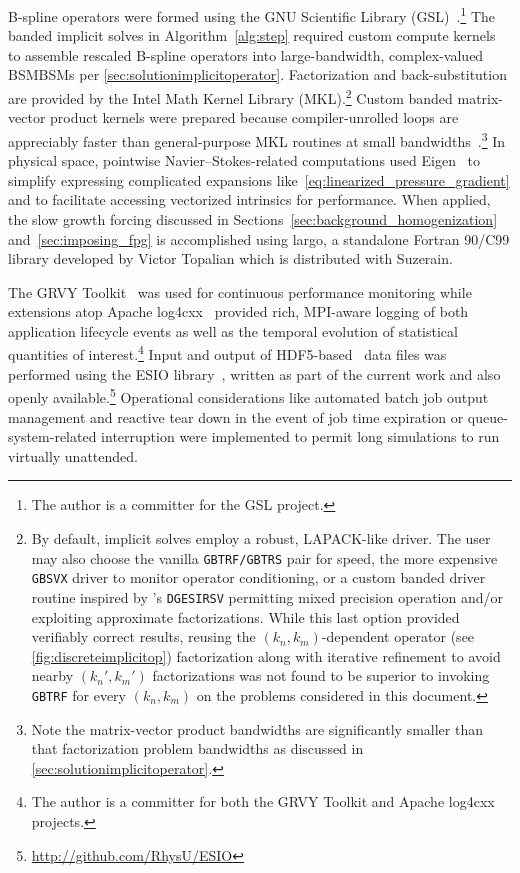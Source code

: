 B-spline operators were formed using the GNU Scientific Library
(GSL)~\citep{Eaton2008GNU}.\footnote{%
    The author is a committer for the GSL project.
}
The banded implicit solves in Algorithm~\ref{alg:step} required custom compute
kernels to assemble rescaled B-spline operators into large-bandwidth,
complex-valued BSMBSMs per \autoref{sec:solutionimplicitoperator}.
Factorization and back-substitution are provided by
the Intel\textsuperscript{\textregistered} Math Kernel Library (MKL).\footnote{%
    By default, implicit solves employ a robust, LAPACK-like driver.  The user
    may also choose the vanilla \texttt{GBTRF/GBTRS} pair for speed, the more
    expensive \texttt{GBSVX} driver to monitor operator conditioning, or a
    custom banded driver routine inspired by \citet{Langou2006Exploiting}'s
    \texttt{DGESIRSV} permitting mixed precision operation and/or exploiting
    approximate factorizations.  While this last option provided verifiably
    correct results, reusing the $(k_n,k_m)$-dependent operator (see
    \autoref{fig:discreteimplicitop}) factorization along with iterative
    refinement to avoid nearby $(k_n',k_m')$ factorizations was not found to be
    superior to invoking \texttt{GBTRF} for every $(k_n,k_m)$ on the problems
    considered in this document.
}
Custom banded matrix-vector product kernels were prepared because
compiler-unrolled loops are appreciably faster than general-purpose
MKL routines at small bandwidths~\citep{Lee2013Petascale}.\footnote{%
    Note the matrix-vector product bandwidths are significantly
    smaller than that factorization problem bandwidths as discussed in
    \autoref{sec:solutionimplicitoperator}.
}
In physical space, pointwise
Navier--Stokes-related computations used Eigen~\citep{eigenweb}
to simplify expressing complicated expansions
like~\eqref{eq:linearized_pressure_gradient} and to facilitate accessing
vectorized intrinsics for performance.  When applied, the slow growth forcing
discussed in
Sections~\ref{sec:background_homogenization} and~\ref{sec:imposing_fpg} is
accomplished using largo, a standalone Fortran 90/C99 library developed by Victor
Topalian which is distributed with Suzerain.

The GRVY Toolkit~\citep{GRVYweb} was used for continuous performance monitoring
while extensions atop Apache log4cxx~\citep{log4cxxweb} provided rich, MPI-aware
logging of both application lifecycle events as well as the temporal evolution
of statistical quantities of interest.\footnote{The author is a committer for both
the GRVY Toolkit and Apache log4cxx projects.}  Input and output of
HDF5-based~\citep{hdf5} data files was performed using the
ESIO library~\citep{ESIOweb}, written as part of the current work and also
openly available.\footnote{\url{http://github.com/RhysU/ESIO}}  Operational
considerations like automated batch job output management and reactive tear down
in the event of job time expiration or queue-system-related interruption were
implemented to permit long simulations to run virtually unattended.

